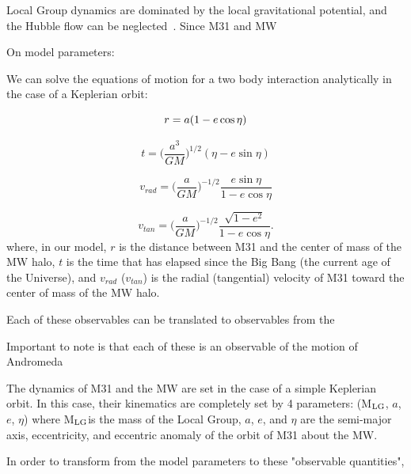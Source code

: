 \documentclass[twocolumn]{aastex631}
\newcommand{\mlg}{M$_{\rm LG}$}
\begin{document}
Local Group dynamics are dominated by the local gravitational potential, and the Hubble flow can be neglected~\cite{}. Since M31 and MW 

On model parameters:


We can solve the equations of motion for a two body interaction analytically in the case of a Keplerian orbit:

\begin{equation}\label{eq:r}
  r = a(1-e\cos\eta)\\
\end{equation}

\begin{equation}\label{eq:t}
  t=\bigg(\frac{a^3}{GM}\bigg)^{1/2}(\eta-e\sin\eta)
\end{equation}

\begin{equation}\label{eq:vrad}
  v_{rad} = \bigg( \frac{a}{GM} \bigg)^{-1/2} \frac{e\sin\eta}{1-e\cos\eta}
\end{equation}

\begin{equation}\label{eq:vtan}
  v_{tan}= \bigg( \frac{a}{GM} \bigg)^{-1/2} \frac{\sqrt{1-e^2}}{1-e\cos\eta}.
\end{equation}
where, in our model, $r$ is the distance between M31 and the center of mass of the MW halo, $t$ is the time that has elapsed since the Big Bang (the current age of the Universe), and $v_{rad}$ ($v_{tan}$) is the radial (tangential) velocity of M31 toward the center of mass of the MW halo. 

Each of these observables can be translated to observables from the 

Important to note is that each of these is an observable of the motion of Andromeda

The dynamics of M31 and the MW are set in the case of a simple Keplerian orbit. In this case, their kinematics are completely set by 4 parameters: (\mlg, $a$, $e$, $\eta$) where \mlg is the mass of the Local Group, $a$, $e$, and $\eta$ are the semi-major axis, eccentricity, and eccentric anomaly of the orbit of M31 about the MW. 



In order to transform from the model parameters to these "observable quantities", 
\end{document}
